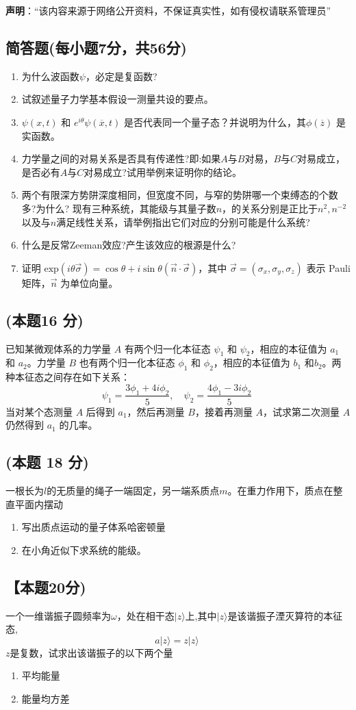 
\textbf{声明}：“该内容来源于网络公开资料，不保证真实性，如有侵权请联系管理员”

\subsection{简答题(每小题7分，共56分)}
\begin{enumerate}
\item 为什么波函数$\psi$，必定是复函数?
\item 试叙述量子力学基本假设一测量共设的要点。
\item $\psi(x,t)$ 和 $e^{i\theta}\psi(\overline x,t)$ 是否代表同一个量子态？并说明为什么，其$\phi(\overline z)$ 是实函数。
\item 力学量之间的对易关系是否具有传递性?即:如果$A$与$B$对易，$B$与$C$对易成立，是否必有$A$与$C$对易成立?试用举例来证明你的结论。
\item 两个有限深方势阱深度相同，但宽度不同，与窄的势阱哪一个束缚态的个数多?为什么?
现有三种系统，其能级与其量子数$n$，的关系分别是正比于$n^2,n^{-2}$以及与$n$满足线性关系，请举例指出它们对应的分别可能是什么系统?
\item 什么是反常Zeeman效应?产生该效应的根源是什么?
\item 证明 $\text{exp}(i\theta \vec{\sigma}) = \cos \theta + i \sin \theta (\vec{n} \cdot \vec{\sigma})$，其中 $\vec{\sigma} = (\sigma_x, \sigma_y, \sigma_z)$ 表示 Pauli 矩阵，$\vec{n}$ 为单位向量。
\end{enumerate}
\subsection{(本题16 分)}
已知某微观体系的力学量 $A$ 有两个归一化本征态 $\psi_1$ 和 $\psi_2$，相应的本征值为 $a_1$ 和 $a_2$。力学量 $B$ 也有两个归一化本征态 $\phi_1$ 和 $\phi_2$，相应的本征值为 $b_1$ 和$b_2$。两种本征态之间存在如下关系：
$$\psi_1 = \frac{3\phi_1 + 4i\phi_2}{5}, \quad \psi_2 = \frac{4\phi_1 - 3i\phi_2}{5}~$$
当对某个态测量 $A$ 后得到 $a_1$，然后再测量 $B$，接着再测量 $A$，试求第二次测量 $A$ 仍然得到 $a_1$ 的几率。
\subsection{(本题 18 分)}
一根长为$l$的无质量的绳子一端固定，另一端系质点$m$。在重力作用下，质点在整直平面内摆动
\begin{enumerate}
\item 写出质点运动的量子体系哈密顿量
\item 在小角近似下求系统的能级。
\end{enumerate}
\subsection{【本题20分)}
一个一维谐振子圆频率为$\omega$，处在相干态$|z\rangle$上,其中$|z\rangle$是该谐振子湮灭算符的本征态,
$$a |z\rangle = z |z\rangle~$$
$z$是复数，试求出该谐振子的以下两个量
\begin{enumerate}
\item 平均能量
\item 能量均方差
\end{enumerate}
